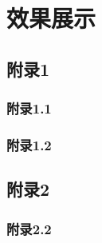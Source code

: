 \documentclass[cn]{inkbook}
\begin{document}
    \part{效果展示}
    \blinddocument
    \appendix

    \chapter{附录1}

    \section{附录1.1}

    \lipsum[1-5]

    \section{附录1.2}

    \lipsum[1-5]

    \chapter{附录2}

    \section{附录2.2}

    \lipsum[2]
    \listoffigures
\end{document}
